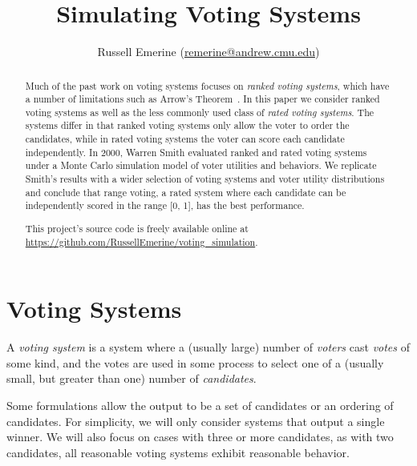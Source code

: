 \documentclass[11pt]{article}
\begin{document}
    \setlength{\parindent}{0pt}
    \setlength{\parskip}{5pt}
    \setlength{\headheight}{14.49999pt}
    \addtolength{\topmargin}{-1.59999pt}

    \title{Simulating Voting Systems}
    \author{\normalsize{Russell Emerine (\url{remerine@andrew.cmu.edu})}}
    \date{}

    \maketitle

    \begin{abstract}
        Much of the past work on voting systems focuses on \textit{ranked voting systems},
        which have a number of limitations such as Arrow's Theorem~\cite{Arrow}.
        In this paper we consider ranked voting systems as well as the less commonly
        used class of \textit{rated voting systems}.
        The systems differ in that ranked voting systems only allow the voter to order the candidates,
        while in rated voting systems the voter can score each candidate independently.
        In 2000, Warren Smith \cite{Smith} evaluated ranked and rated voting systems
        under a Monte Carlo simulation model of voter utilities and behaviors.
        We replicate Smith's results with a wider selection of voting systems and voter utility distributions
        and conclude that range voting,
        a rated system where each candidate can be independently scored in the range [0, 1],
        has the best performance.

        This project's source code is freely available online at \url{https://github.com/RussellEmerine/voting_simulation}.
    \end{abstract}


    \section{Voting Systems}\label{sec:voting-systems}

    A \textit{voting system} is a system where
    a (usually large) number of \textit{voters} cast \textit{votes} of some kind,
    and the votes are used in some process to select one of
    a (usually small, but greater than one) number of \textit{candidates}.

    Some formulations allow the output to be a set of candidates or an ordering of candidates.
    For simplicity, we will only consider systems that output a single winner.
    We will also focus on cases with three or more candidates, as with two candidates,
    all reasonable voting systems exhibit reasonable behavior.
\end{document}
